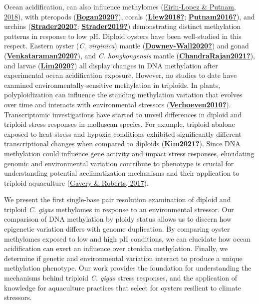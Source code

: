 \documentclass [11pt, proquest] {uwthesis}[2015/03/03]
\begin{document}
Ocean acidification, can also influence methylomes (\protect\hyperlink{ref-Eirin-Lopez2018}{Eirin-Lopez \& Putnam, 2018}), with pteropods (\protect\hyperlink{ref-Bogan2020}{\textbf{Bogan2020?}}), corals (\protect\hyperlink{ref-Liew2018}{\textbf{Liew2018?}}; \protect\hyperlink{ref-Putnam2016}{\textbf{Putnam2016?}}), and urchins (\protect\hyperlink{ref-Strader2020}{\textbf{Strader2020?}}; \protect\hyperlink{ref-Strader2019}{\textbf{Strader2019?}}) demonstrating distinct methylation patterns in response to low pH. Diploid oysters have been well-studied in this respect. Eastern oyster (\emph{C. virginica}) mantle (\protect\hyperlink{ref-Downey-Wall2020}{\textbf{Downey-Wall2020?}}) and gonad (\protect\hyperlink{ref-Venkataraman2020}{\textbf{Venkataraman2020?}}), and \emph{C. hongkongensis} mantle (\protect\hyperlink{ref-ChandraRajan2021}{\textbf{ChandraRajan2021?}}), and larvae (\protect\hyperlink{ref-Lim2020}{\textbf{Lim2020?}}) all display changes in DNA methylation after experimental ocean acidification exposure. However, no studies to date have examined environmentally-sensitive methylation in triploids. In plants, polyploidization can influence the standing methylation variation that evolves over time and interacts with environmental stressors (\protect\hyperlink{ref-Verhoeven2010}{\textbf{Verhoeven2010?}}). Transcriptomic investigations have started to unveil differences in diploid and triploid stress responses in molluscan species. For example, triploid abalone exposed to heat stress and hypoxia conditions exhibited significantly different transcriptional changes when compared to diploids (\protect\hyperlink{ref-Kim2021}{\textbf{Kim2021?}}). Since DNA methylation could influence gene activity and impact stress responses, elucidating genomic and environmental variation contribute to phenotype is crucial for understanding potential acclimatization mechanisms and their application to triploid aquaculture (\protect\hyperlink{ref-Gavery2017}{Gavery \& Roberts, 2017}).

We present the first single-base pair resolution examination of diploid and triploid \emph{C. gigas} methylomes in response to an environmental stressor. Our comparison of DNA methylation by ploidy status allows us to discern how epigenetic variation differs with genome duplication. By comparing oyster methylomes exposed to low and high pH conditions, we can elucidate how ocean acidification can exert an influence over ctenidia methylation. Finally, we determine if genetic and environmental variation interact to produce a unique methylation phenotype. Our work provides the foundation for understanding the mechanisms behind triploid \emph{C. gigas} stress responses, and the application of knowledge for aquaculture practices that select for oysters resilient to climate stressors.
\end{document}
